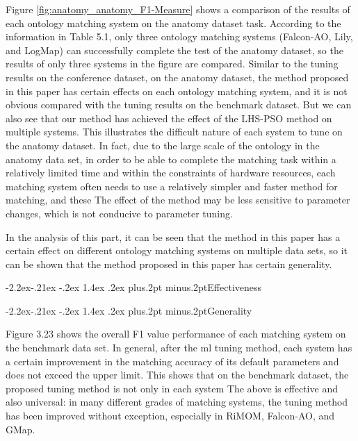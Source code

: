 \documentclass[twoside]{article}
\makeatletter
\def\subsection{\@startsection{subsection}{2}{\z@}%
 {-3ex\@plus -.2ex \@minus -.2ex}%
 {2ex \@plus.2ex}%
{\normalfont\normalsize\protect\baselineskip=12.5pt plus.2pt minus.2pt\bfseries}}
\def\subsubsection{\@startsection{subsubsection}{3}{\z@}%
 {-2.2ex\@plus -.21ex \@minus -.2ex}%
 {1.4ex \@plus.2ex}
{\normalfont\normalsize\protect\baselineskip=12pt plus.2pt minus.2pt\sl}}
\makeatother
\begin{document}
Figure \ref{fig:anatomy_anatomy_F1-Measure} shows a comparison of the results of each ontology matching system on the anatomy dataset task.
According to the information in Table 5.1, only three ontology matching systems (Falcon-AO, Lily, and LogMap) can successfully complete the test of the anatomy dataset, so the results of only three systems in the figure are compared.
Similar to the tuning results on the conference dataset, on the anatomy dataset, the method proposed in this paper has certain effects on each ontology matching system, and it is not obvious compared with the tuning results on the benchmark dataset.
But we can also see that our method has achieved the effect of the LHS-PSO method on multiple systems.
This illustrates the difficult nature of each system to tune on the anatomy dataset.
In fact, due to the large scale of the ontology in the anatomy data set, in order to be able to complete the matching task within a relatively limited time and within the constraints of hardware resources, each matching system often needs to use a relatively simpler and faster method for matching, and these The effect of the method may be less sensitive to parameter changes, which is not conducive to parameter tuning.

In the analysis of this part, it can be seen that the method in this paper has a certain effect on different ontology matching systems on multiple data sets, so it can be shown that the method proposed in this paper has certain generality.


\subsubsection{Effectiveness}


\subsubsection{Generality}

Figure 3.23 shows the overall F1 value performance of each matching system on the benchmark data set.
In general, after the ml tuning method, each system has a certain improvement in the matching accuracy of its default parameters and does not exceed the upper limit. This shows that on the benchmark dataset, the proposed tuning method is not only in each system The above is effective and also universal: in many different grades of matching systems, the tuning method has been improved without exception, especially in RiMOM, Falcon-AO, and GMap.
\end{document}
